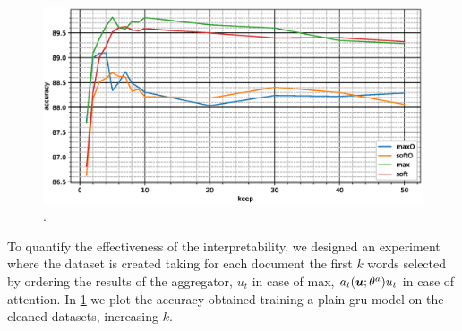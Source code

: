 \begin{figure}
  \centering
  \includegraphics[width=\floatwidth]{img/plotSintex.eps}
  \caption{.}
  \label{fig:sintex}
\end{figure}
To quantify the effectiveness of the interpretability, we designed an
experiment where the dataset is created taking for each document the
first $k$ words selected by  
ordering the results of the aggregator, $u_t$ in case of max,
$a_t(\bm{u};\theta^a)u_t$ in case of attention. In \cref{fig:sintex}
we plot the accuracy obtained training a plain \ac{gru} model on the
cleaned datasets, increasing $k$. 



